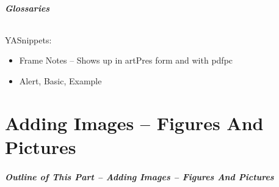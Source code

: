 \begin{frame}[fragile,label=Glossaries]
    \frametitle{Glossaries}
    \framesubtitle{}

    YASnippets:

    \begin{itemize}
    \item Frame Notes  -- Shows up in artPres form and with pdfpc
    \item Alert, Basic, Example
    \end{itemize}

\end{frame}



\begin{comment}
*      ================
*  [[elisp:(org-cycle)][| ]] [[elisp:(org-show-subtree)][|=]] [[elisp:(show-children 10)][|V]] [[elisp:(bx:orgm:indirectBufOther)][|>]] [[elisp:(bx:orgm:indirectBufMain)][|I]] [[elisp:(blee:ppmm:org-mode-toggle)][|N]] [[elisp:(org-top-overview)][|O]] [[elisp:(progn (org-shifttab) (org-content))][|C]] [[elisp:(delete-other-windows)][|1]]  *Part 0*   /Adding Images -- Figures And Pictures/ ::  [[elisp:(org-cycle)][| ]]
\end{comment}

\newpage
\part{Adding Images -- Figures And Pictures}
\label{part:AddingImages--FiguresAndPictures}

\begin{latexonly}
\begin{presentationMode}
\begin{frame}[fragile,plain,label=Part0]
\frametitle{Outline of This Part -- Adding Images -- Figures And Pictures}
\tableofcontents[sectionstyle=show,subsectionstyle=show]
\end{frame}
\end{presentationMode}
\end{latexonly}




\begin{comment}
*  [[elisp:(org-cycle)][| ]] [[elisp:(org-show-subtree)][|=]] [[elisp:(show-children 10)][|V]] [[elisp:(bx:orgm:indirectBufOther)][|>]] [[elisp:(bx:orgm:indirectBufMain)][|I]] [[elisp:(blee:ppmm:org-mode-toggle)][|N]] [[elisp:(org-top-overview)][|O]] [[elisp:(progn (org-shifttab) (org-content))][|C]] [[elisp:(delete-other-windows)][|1]]  /Section/   Adding Images -- Figures And Pictures ::  [[elisp:(org-cycle)][| ]]
\end{comment}

